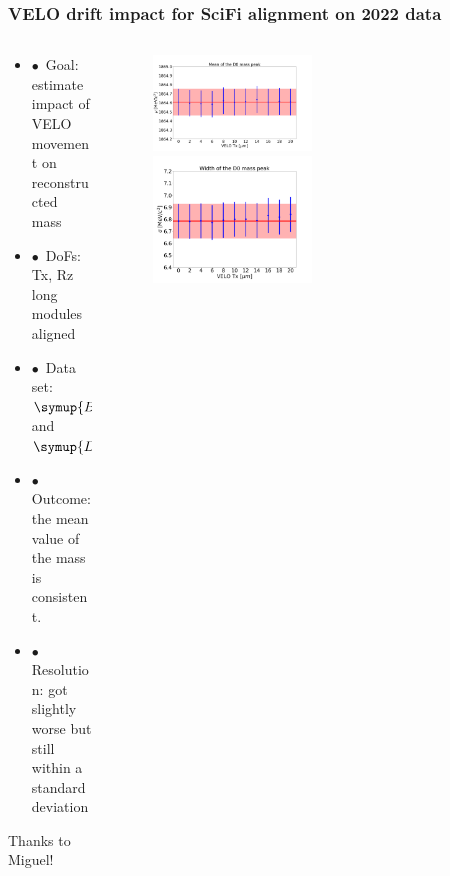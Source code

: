 \documentclass[aspectratio=1610, 12pt, xcolor=dvipsnames]{beamer}
\begin{document}
\begin{frame}\frametitle{VELO drift impact for SciFi alignment on 2022 data}
  \begin{columns}
    \begin{column}[c]{0.48\textwidth}
      \begin{itemize}
        \item $\bullet$\, Goal: estimate impact of VELO movement on reconstructed mass
        \item $\bullet$\, DoFs: Tx, Rz long modules aligned
        \item $\bullet$\, Data set: $\symup{B}^0 \to D^{*}\pi$ and $\symup{D}_0 \to \symup{K}\pi$
        \item $\bullet$\, Outcome: the mean value of the mass is consistent. 
        \item $\bullet$\, Resolution: got slightly worse but still within a standard deviation
      \end{itemize}
      

      Thanks to Miguel!
    \end{column}
    \begin{column}[c]{0.48\textwidth}
      \begin{figure}
        \includegraphics[width=0.5\textwidth]{reading_material/current_stuff/velo_drift_plots/plots/D0_massvalue_largeVPTx.png}
        \includegraphics[width=0.5\textwidth]{reading_material/current_stuff/velo_drift_plots/plots/D0_resolution_smallVPTx.png}
      \end{figure}
    \end{column}
  \end{columns}
\end{frame}
\end{document}
